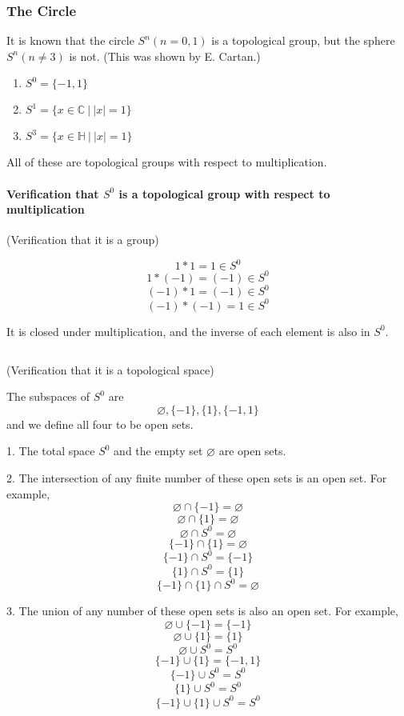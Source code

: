 \documentclass[uplatex,a4j,12pt,dvipdfmx]{jsarticle}
\begin{document}
\subsubsection{The Circle}

It is known that the circle $S^{n} (n=0,1)$ is a topological group, but the sphere $S^{n} (n \neq 3)$ is not.
(This was shown by E. Cartan.)

\begin{enumerate}
	\item $S^{0} = \{ -1, 1 \}$
	\item $S^{1} = \{ x \in \mathbb{C} \ | \ |x| = 1 \}$
	\item $S^{3} = \{ x \in \mathbb{H} \ | \ |x| = 1 \}$
\end{enumerate}

All of these are topological groups with respect to multiplication.


\paragraph{Verification that $S^{0}$ is a topological group with respect to multiplication}

{}

(Verification that it is a group)

$$1*1=1 \in S^{0}$$
$$1*(-1)=(-1) \in S^{0}$$
$$(-1)*1=(-1) \in S^{0}$$
$$(-1)*(-1)=1 \in S^{0}$$

It is closed under multiplication, and the inverse of each element is also in $S^{0}$.

	${}$

(Verification that it is a topological space)

The subspaces of $S^{0}$ are
$$\varnothing, \{ -1 \} , \{ 1 \} , \{ -1 , 1 \}$$
and we define all four to be open sets.

1. The total space $S^{0}$ and the empty set $\varnothing$ are open sets.

2. The intersection of any finite number of these open sets is an open set.
For example,
$$\varnothing \cap \{ -1 \} = \varnothing$$
$$\varnothing \cap \{ 1 \} = \varnothing$$
$$\varnothing \cap S^{0} = \varnothing$$
$$ \{ -1 \} \cap \{ 1 \} = \varnothing$$
$$ \{ -1 \} \cap S^{0} = \{ -1 \} $$
$$ \{ 1 \} \cap S^{0} = \{ 1 \} $$
$$ \{ -1 \} \cap \{ 1 \} \cap S^{0} = \varnothing $$

3. The union of any number of these open sets is also an open set.
For example,
$$\varnothing \cup \{ -1 \} = \{ -1 \}$$
$$\varnothing \cup \{ 1 \} = \{ 1 \}$$
$$\varnothing \cup S^{0} = S^{0}$$
$$ \{ -1 \} \cup \{ 1 \} = \{ -1 , 1 \}$$
$$ \{ -1 \} \cup S^{0} = S^{0} $$
$$ \{ 1 \} \cup S^{0} = S^{0} $$
$$ \{ -1 \} \cup \{ 1 \} \cup S^{0} = S^{0} $$
\end{document}
